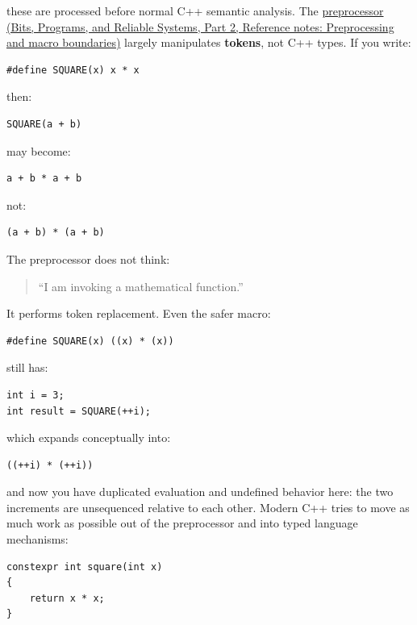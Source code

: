 these are processed before normal C++ semantic analysis. The \href{../01-Bits-Programs-and-Reliable-Systems-P02/main.pdf\#nameddest=appendix-33c0a92ce855}{preprocessor (Bits, Programs, and Reliable Systems, Part 2, Reference notes: Preprocessing and macro boundaries)} largely manipulates \textbf{tokens}, not C++ types. If you write:

\begin{verbatim}
#define SQUARE(x) x * x
\end{verbatim}

then:

\begin{verbatim}
SQUARE(a + b)
\end{verbatim}

may become:

\begin{verbatim}
a + b * a + b
\end{verbatim}

not:

\begin{verbatim}
(a + b) * (a + b)
\end{verbatim}

The preprocessor does not think:

\begin{quote}
``I am invoking a mathematical function.''
\end{quote}

It performs token replacement. Even the safer macro:

\begin{verbatim}
#define SQUARE(x) ((x) * (x))
\end{verbatim}

still has:

\begin{verbatim}
int i = 3;
int result = SQUARE(++i);
\end{verbatim}

which expands conceptually into:

\begin{verbatim}
((++i) * (++i))
\end{verbatim}

and now you have duplicated evaluation and undefined behavior here: the two increments are unsequenced relative to each other. Modern C++ tries to move as much work as possible out of the preprocessor and into typed language mechanisms:

\begin{verbatim}
constexpr int square(int x)
{
    return x * x;
}
\end{verbatim}


